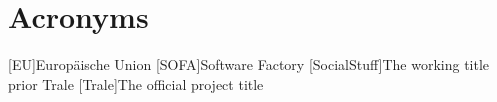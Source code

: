 \chapter{Acronyms}\label{ch:acronyms}
\begin{acronym}
    [EU]{Europäische Union}
    [SOFA]{Software Factory}
    [SocialStuff]{The working title prior Trale}
    [Trale]{The official project title}
\end{acronym}
